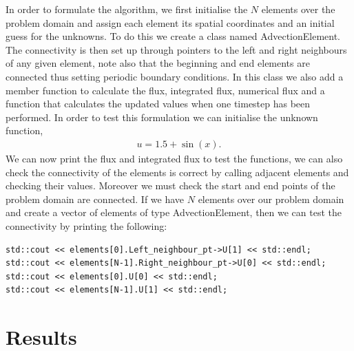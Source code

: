\documentclass[a4paper, 12pt]{article}
\begin{document}
In order to formulate the algorithm, we first initialise the $N$ elements over the problem domain and assign each element its spatial coordinates and an initial guess for the unknowns. To do this we create a class named AdvectionElement. The connectivity is then set up through pointers to the left and right neighbours of any given element, note also that the beginning and end elements are connected thus setting periodic boundary conditions. In this class we also add a member function to calculate the flux, integrated flux, numerical flux and a function that calculates the updated values when one timestep has been performed. In order to test this formulation we can initialise the unknown function,
\begin{align*}
u = 1.5 + \sin(x).
\end{align*}
We can now print the flux and integrated flux to test the functions, we can also check the connectivity of the elements is correct by calling adjacent elements and checking their values. Moreover we must check the start and end points of the problem domain are connected. If we have $N$ elements over our problem domain and create a vector of elements of type AdvectionElement, then we can test the connectivity by printing the following:
\begin{verbatim}
std::cout << elements[0].Left_neighbour_pt->U[1] << std::endl;
std::cout << elements[N-1].Right_neighbour_pt->U[0] << std::endl;
std::cout << elements[0].U[0] << std::endl;
std::cout << elements[N-1].U[1] << std::endl;
\end{verbatim}

 


\newpage
\section{Results}
\end{document}
